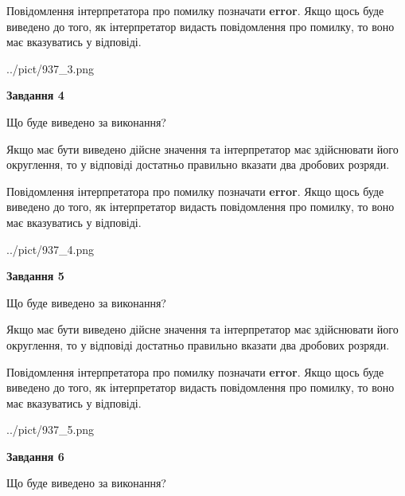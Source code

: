 \documentclass[12pt, ukrainian]{article}
\begin{document}
{\begin {Large}
Повідомлення інтерпретатора про помилку позначати \textbf{error}.
Якщо щось буде виведено до того, як інтерпретатор видасть повідомлення про помилку, 
то воно має вказуватись у відповіді. \par

\begin{center}
	{../pict/937_3.png}
\end{center}
\newpage

{\begin {center}\textbf{Завдання 4}\end {center}}\par
Що буде виведено за виконання? \par

Якщо має бути виведено дійсне значення та інтерпретатор має здійснювати його округлення, 
то у відповіді достатньо правильно вказати два дробових розряди.

Повідомлення інтерпретатора про помилку позначати \textbf{error}.
Якщо щось буде виведено до того, як інтерпретатор видасть повідомлення про помилку, 
то воно має вказуватись у відповіді. \par

\begin{center}
	{../pict/937_4.png}
\end{center}
\newpage

{\begin {center}\textbf{Завдання 5}\end {center}}\par
Що буде виведено за виконання? \par

Якщо має бути виведено дійсне значення та інтерпретатор має здійснювати його округлення, 
то у відповіді достатньо правильно вказати два дробових розряди.

Повідомлення інтерпретатора про помилку позначати \textbf{error}.
Якщо щось буде виведено до того, як інтерпретатор видасть повідомлення про помилку, 
то воно має вказуватись у відповіді. \par

\begin{center}
	{../pict/937_5.png}
\end{center}
\newpage

{\begin {center}\textbf{Завдання 6}\end {center}}\par
Що буде виведено за виконання? \par


\end{Large}}
\end{document}
